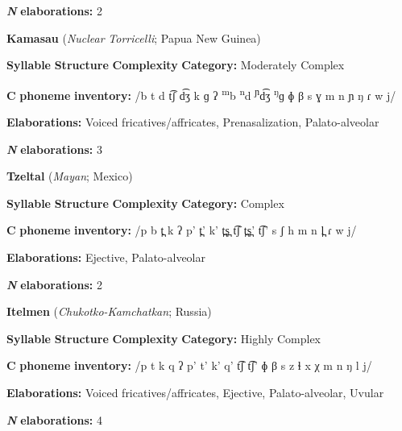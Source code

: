 \textbf{\textit{N}} \textbf{elaborations:} 2

\z


\ea\label{ex:(4.29)}
  \textbf{Kamasau} (\textit{Nuclear} \textit{Torricelli}; Papua New Guinea)



\textbf{Syllable} \textbf{Structure} \textbf{Complexity} \textbf{Category:} Moderately Complex



\textbf{C} \textbf{phoneme} \textbf{inventory:} /b t d t͡ʃ d͡ʒ k ɡ ʔ \textsuperscript{m}b \textsuperscript{n}d \textsuperscript{ɲ}d͡ʒ \textsuperscript{ŋ}ɡ ɸ β s ɣ m n ɲ ŋ ɾ w j/



\textbf{Elaborations:} Voiced fricatives/affricates, Prenasalization, Palato-alveolar



\textbf{\textit{N}} \textbf{elaborations:} 3

\z


\ea\label{ex:(4.30)}
  \textbf{Tzeltal} (\textit{Mayan}; Mexico)



\textbf{Syllable} \textbf{Structure} \textbf{Complexity} \textbf{Category:} Complex



\textbf{C} \textbf{phoneme} \textbf{inventory:} /p b t̪ k ʔ p’ t̪’ k’ t̪s̪ t͡ʃ t̪s̪’ t͡ʃ’ s ʃ h m n l̪ ɾ w j/ 



\textbf{Elaborations:} Ejective, Palato-alveolar



\textbf{\textit{N}} \textbf{elaborations:} 2

\z


\ea\label{ex:(4.31)}
  \textbf{Itelmen} (\textit{Chukotko-Kamchatkan}; Russia)



\textbf{Syllable} \textbf{Structure} \textbf{Complexity} \textbf{Category:} Highly Complex



\textbf{C} \textbf{phoneme} \textbf{inventory:} /p t k q ʔ p’ t’ k’ q’ t͡ʃ t͡ʃ’ ɸ β s z ɬ x χ m n ŋ l j/



\textbf{Elaborations:} Voiced fricatives/affricates, Ejective, Palato-alveolar, Uvular 



\textbf{\textit{N}} \textbf{elaborations:} 4

